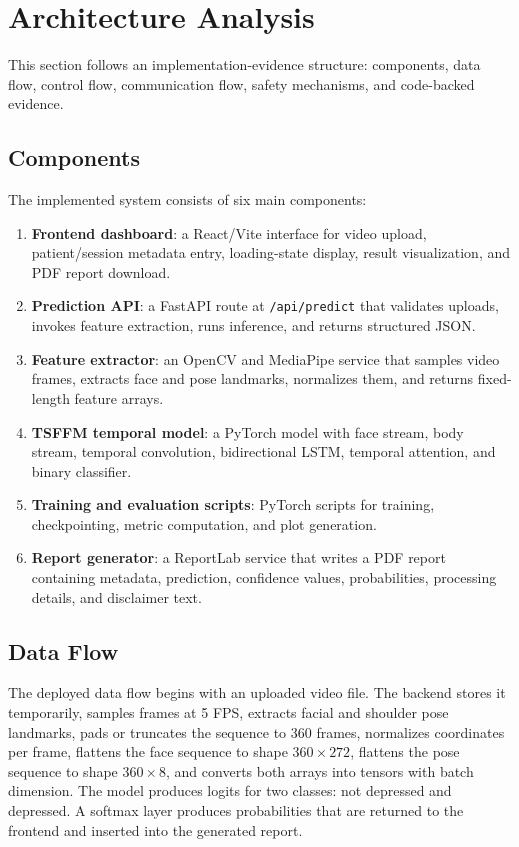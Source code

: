 \documentclass[conference]{IEEEtran}
\begin{document}
\section{Architecture Analysis}
This section follows an implementation-evidence structure: components, data flow, control flow, communication flow, safety mechanisms, and code-backed evidence.

\subsection{Components}
The implemented system consists of six main components:
\begin{enumerate}
\item \textbf{Frontend dashboard}: a React/Vite interface for video upload, patient/session metadata entry, loading-state display, result visualization, and PDF report download.
\item \textbf{Prediction API}: a FastAPI route at \texttt{/api/predict} that validates uploads, invokes feature extraction, runs inference, and returns structured JSON.
\item \textbf{Feature extractor}: an OpenCV and MediaPipe service that samples video frames, extracts face and pose landmarks, normalizes them, and returns fixed-length feature arrays.
\item \textbf{TSFFM temporal model}: a PyTorch model with face stream, body stream, temporal convolution, bidirectional LSTM, temporal attention, and binary classifier.
\item \textbf{Training and evaluation scripts}: PyTorch scripts for training, checkpointing, metric computation, and plot generation.
\item \textbf{Report generator}: a ReportLab service that writes a PDF report containing metadata, prediction, confidence values, probabilities, processing details, and disclaimer text.
\end{enumerate}

\subsection{Data Flow}
The deployed data flow begins with an uploaded video file. The backend stores it temporarily, samples frames at 5 FPS, extracts facial and shoulder pose landmarks, pads or truncates the sequence to 360 frames, normalizes coordinates per frame, flattens the face sequence to shape \(360 \times 272\), flattens the pose sequence to shape \(360 \times 8\), and converts both arrays into tensors with batch dimension. The model produces logits for two classes: not depressed and depressed. A softmax layer produces probabilities that are returned to the frontend and inserted into the generated report.
\end{document}
